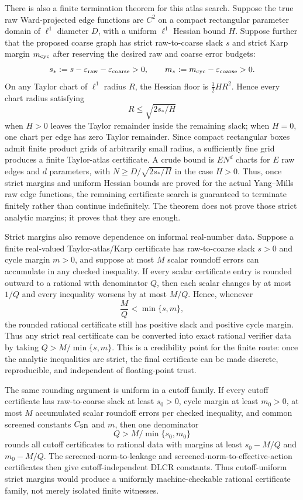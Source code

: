 There is also a finite termination theorem for this atlas search. Suppose the
true raw Ward-projected edge functions are $C^2$ on a compact rectangular
parameter domain of $\ell^1$ diameter $D$, with a uniform $\ell^1$ Hessian
bound $H$. Suppose further that the proposed coarse graph has strict
raw-to-coarse slack $s$ and strict Karp margin $m_{\rm cyc}$ after reserving
the desired raw and coarse error budgets:
\[
  s_*:=s-\varepsilon_{\rm raw}-\varepsilon_{\rm coarse}>0,
  \qquad
  m_*:=m_{\rm cyc}-\varepsilon_{\rm coarse}>0 .
\]
On any Taylor chart of $\ell^1$ radius $R$, the Hessian floor is
$\frac12 H R^2$. Hence every chart radius satisfying
\[
  R\leq \sqrt{2s_*/H}
\]
when $H>0$ leaves the Taylor remainder inside the remaining slack; when
$H=0$, one chart per edge has zero Taylor remainder. Since compact rectangular
boxes admit finite product grids of arbitrarily small radius, a sufficiently
fine grid produces a finite Taylor-atlas certificate. A crude bound is
$E N^d$ charts for $E$ raw edges and $d$ parameters, with
$N\geq D/\sqrt{2s_*/H}$ in the case $H>0$. Thus, once strict margins and
uniform Hessian bounds are proved for the actual Yang--Mills raw edge
functions, the remaining certificate search is guaranteed to terminate
finitely rather than continue indefinitely. The theorem does not prove those
strict analytic margins; it proves that they are enough.

Strict margins also remove dependence on informal real-number data. Suppose a
finite real-valued Taylor-atlas/Karp certificate has raw-to-coarse slack
$s>0$ and cycle margin $m>0$, and suppose at most $M$ scalar roundoff errors
can accumulate in any checked inequality. If every scalar certificate entry is
rounded outward to a rational with denominator $Q$, then each scalar changes
by at most $1/Q$ and every inequality worsens by at most $M/Q$. Hence, whenever
\[
  \frac{M}{Q}<\min\{s,m\},
\]
the rounded rational certificate still has positive slack and positive cycle
margin. Thus any strict real certificate can be converted into exact rational
verifier data by taking $Q>M/\min\{s,m\}$. This is a credibility point for the
finite route: once the analytic inequalities are strict, the final certificate
can be made discrete, reproducible, and independent of floating-point trust.

The same rounding argument is uniform in a cutoff family. If every cutoff
certificate has raw-to-coarse slack at least $s_0>0$, cycle margin at least
$m_0>0$, at most $M$ accumulated scalar roundoff errors per checked
inequality, and common screened constants $C_{\rm SB}$ and $m$, then one
denominator
\[
  Q>M/\min\{s_0,m_0\}
\]
rounds all cutoff certificates to rational data with margins at least
$s_0-M/Q$ and $m_0-M/Q$. The screened-norm-to-leakage and
screened-norm-to-effective-action certificates then give cutoff-independent
DLCR constants. Thus cutoff-uniform strict margins would produce a uniformly
machine-checkable rational certificate family, not merely isolated finite
witnesses.

